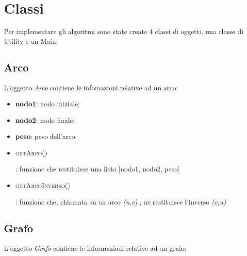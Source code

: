 \section{Classi}
\label{Classi}

Per implementare gli algoritmi sono state create 4 classi di oggetti, una classe di Utility e un Main.

\subsection{Arco}
\label{Arco}

L'oggetto \textit{Arco} contiene le infomazioni relative ad un arco:

\begin{itemize}
    \item \textbf{nodo1}: nodo iniziale;
    \item \textbf{nodo2}: nodo finale;
    \item \textbf{peso}: peso dell'arco;
    \item \hypertarget{getarco}{\textsc{getArco()}}: funzione che restituisce una lista [nodo1, nodo2, peso]
    \item \hypertarget{getarcoinverso}{\textsc{getArcoInverso()}}: funzione che, chiamata su un arco \emph{(u,v)} , ne restituisce l'inverso \emph{(v,u)}
\end{itemize}


\subsection{Grafo}
\label{Grafo}

L'oggetto \textit{Grafo} contiene le informazioni relative ad un grafo:

